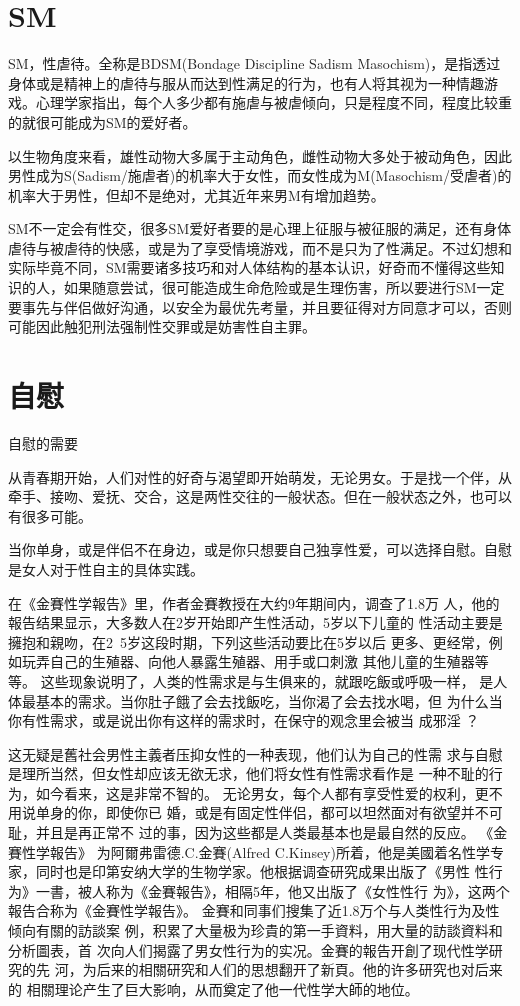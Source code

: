 \documentclass[12pt,UTF8]{ctexbook}
\begin{document}
\chapter{SM}

SM，性虐待。全称是BDSM(Bondage Discipline Sadism Masochism)，是指透过身体或是精神上的虐待与服从而达到性满足的行为，也有人将其视为一种情趣游戏。心理学家指出，每个人多少都有施虐与被虐倾向，只是程度不同，程度比较重的就很可能成为SM的爱好者。

以生物角度来看，雄性动物大多属于主动角色，雌性动物大多处于被动角色，因此男性成为S(Sadism/施虐者)的机率大于女性，而女性成为M(Masochism/受虐者)的机率大于男性，但却不是绝对，尤其近年来男M有增加趋势。

SM不一定会有性交，很多SM爱好者要的是心理上征服与被征服的满足，还有身体虐待与被虐待的快感，或是为了享受情境游戏，而不是只为了性满足。不过幻想和实际毕竟不同，SM需要诸多技巧和对人体结构的基本认识，好奇而不懂得这些知识的人，如果随意尝试，很可能造成生命危险或是生理伤害，所以要进行SM一定要事先与伴侣做好沟通，以安全为最优先考量，并且要征得对方同意才可以，否则可能因此触犯刑法强制性交罪或是妨害性自主罪。

\chapter{自慰}

自慰的需要

从青春期开始，人们对性的好奇与渴望即开始萌发，无论男女。于是找一个伴，从牵手、接吻、爱抚、交合，这是两性交往的一般状态。但在一般状态之外，也可以有很多可能。

当你单身，或是伴侣不在身边，或是你只想要自己独享性爱，可以选择自慰。自慰是女人对于性自主的具体实践。

在《金賽性学報告》里，作者金賽教授在大约9年期间内，调查了1.8万
人，他的報告结果显示，大多数人在2岁开始即产生性活动，5岁以下儿童的
性活动主要是擁抱和親吻，在2~5岁这段时期，下列这些活动要比在5岁以后
更多、更经常，例如玩弄自己的生殖器、向他人暴露生殖器、用手或口刺激
其他儿童的生殖器等等。
这些现象说明了，人类的性需求是与生俱来的，就跟吃飯或呼吸一样，
是人体最基本的需求。当你肚子餓了会去找飯吃，当你渴了会去找水喝，但
为什么当你有性需求，或是说出你有这样的需求时，在保守的观念里会被当
成邪淫 ？

这无疑是舊社会男性主義者压抑女性的一种表现，他们认为自己的性需
求与自慰是理所当然，但女性却应该无欲无求，他们将女性有性需求看作是
一种不耻的行为，如今看来，这是非常不智的。
无论男女，每个人都有享受性爱的权利，更不用说单身的你，即使你已
婚，或是有固定性伴侣，都可以坦然面对有欲望并不可耻，并且是再正常不
过的事，因为这些都是人类最基本也是最自然的反应。
《金賽性学報告》
为阿爾弗雷德.C.金賽(Alfred C.Kinsey)所着，他是美國着名性学专
家，同时也是印第安纳大学的生物学家。他根据调查研究成果出版了《男性
性行为》一書，被人称为《金賽報告》，相隔5年，他又出版了《女性性行
为》，这两个報告合称为《金賽性学報告》。
金賽和同事们搜集了近1.8万个与人类性行为及性倾向有關的訪談案
例，积累了大量极为珍貴的第一手資料，用大量的訪談資料和分析圖表，首
次向人们揭露了男女性行为的实况。金賽的報告开創了现代性学研究的先
河，为后来的相關研究和人们的思想翻开了新頁。他的许多研究也对后来的
相關理论产生了巨大影响，从而奠定了他一代性学大師的地位。
\end{document}
